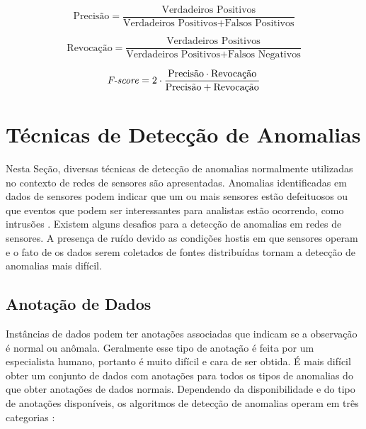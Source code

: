 \documentclass[cic,tc]{iiufrgs}
\begin{document}
\begin{equation}
    \label{precision}
    \textrm{Precisão} = \frac{\textrm{Verdadeiros Positivos}}{\textrm{Verdadeiros Positivos} + \textrm{Falsos Positivos}}
\end{equation}

\begin{equation}
    \label{recall}
    \textrm{Revocação} = \frac{\textrm{Verdadeiros Positivos}}{\textrm{Verdadeiros Positivos} + \textrm{Falsos Negativos}}
\end{equation}

\begin{equation}
    \label{fscore}
    \textrm{\textit{F-score}} = 2\cdot\frac{\textrm{Precisão} \cdot \textrm{Revocação}}{\textrm{Precisão} + \textrm{Revocação}}
\end{equation}

\section{Técnicas de Detecção de Anomalias}
\label{anom_tec}
Nesta Seção, diversas técnicas de detecção de anomalias normalmente utilizadas no contexto de redes de sensores são apresentadas. Anomalias identificadas em dados de sensores podem indicar que um ou mais sensores estão defeituosos ou que eventos que podem ser interessantes para analistas estão ocorrendo, como intrusões \cite{AnomalyDetectionSurvey2009}. Existem alguns desafios para a detecção de anomalias em redes de sensores. A presença de ruído devido as condições hostis em que sensores operam e o fato de os dados serem coletados de fontes distribuídas tornam a detecção de anomalias mais difícil.

\subsection{Anotação de Dados}
Instâncias de dados podem ter anotações associadas que indicam se a observação é normal ou anômala. Geralmente esse tipo de anotação é feita por um especialista humano, portanto é muito difícil e cara de ser obtida. É mais difícil obter um conjunto de dados com anotações para todos os tipos de anomalias do que obter anotações de dados normais. Dependendo da disponibilidade e do tipo de anotações disponíveis, os algoritmos de detecção de anomalias operam em três categorias \cite{AnomalyDetectionSurvey2009}:
\end{document}
